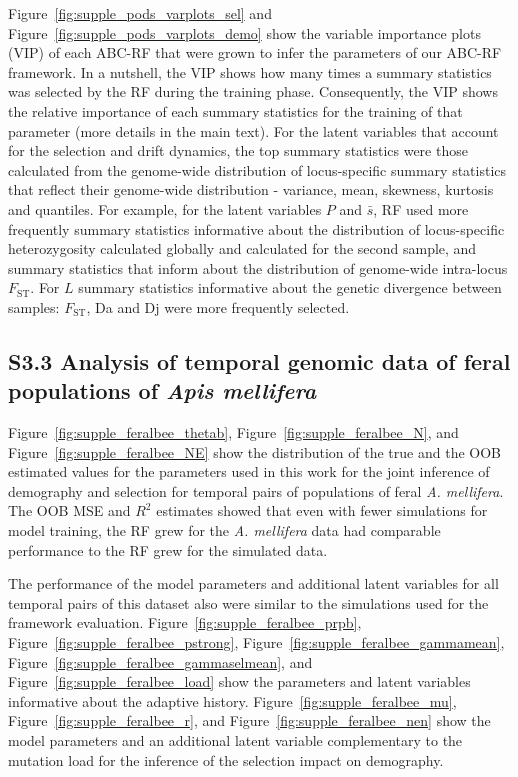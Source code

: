 \documentclass[a4paper, 12pt]{article}
\begin{document}
Figure~\ref{fig:supple_pods_varplots_sel} and Figure~\ref{fig:supple_pods_varplots_demo} show the variable importance plots (VIP) of each ABC-RF that were grown to infer the parameters of our ABC-RF framework. In a nutshell, the VIP shows how many times a summary statistics was selected by the RF during the training phase. Consequently, the VIP shows the relative importance of each summary statistics for the training of that parameter (more details in the main text). For the latent variables that account for the selection and drift dynamics, the top summary statistics were those calculated from the genome-wide distribution of locus-specific summary statistics that reflect their genome-wide distribution - variance, mean, skewness, kurtosis and quantiles. For example, for the latent variables $P$ and $\bar{s}$, RF used more frequently summary statistics informative about the distribution of locus-specific heterozygosity calculated globally and calculated for the second sample, and summary statistics that inform about the distribution of genome-wide intra-locus $F_{\mathrm{ST}}$. For $L$ summary statistics informative about the genetic divergence between samples: $F_{\mathrm{ST}}$, Da and Dj were more frequently selected. 

\subsection*{S3.3 Analysis of temporal genomic data of feral populations of \textit{Apis mellifera}}

Figure~\ref{fig:supple_feralbee_thetab}, Figure~\ref{fig:supple_feralbee_N}, and Figure~\ref{fig:supple_feralbee_NE} show the distribution of the true and the OOB estimated values for the parameters used in this work for the joint inference of demography and selection for temporal pairs of populations of feral \textit{A. mellifera}. The OOB MSE and $R^2$ estimates showed that even with fewer simulations for model training, the RF grew for the  \textit{A. mellifera} data had comparable performance to the RF grew for the simulated data.

The performance of the model parameters and additional latent variables for all temporal pairs of this dataset also were similar to the simulations used for the framework evaluation. Figure~\ref{fig:supple_feralbee_prpb}, Figure~\ref{fig:supple_feralbee_pstrong}, Figure~\ref{fig:supple_feralbee_gammamean}, Figure~\ref{fig:supple_feralbee_gammaselmean}, and Figure~\ref{fig:supple_feralbee_load} show the parameters and latent variables informative about the adaptive history. Figure~\ref{fig:supple_feralbee_mu}, Figure~\ref{fig:supple_feralbee_r}, and Figure~\ref{fig:supple_feralbee_nen} show the model parameters and an additional latent variable complementary to the mutation load for the inference of the selection impact on demography.
\end{document}
